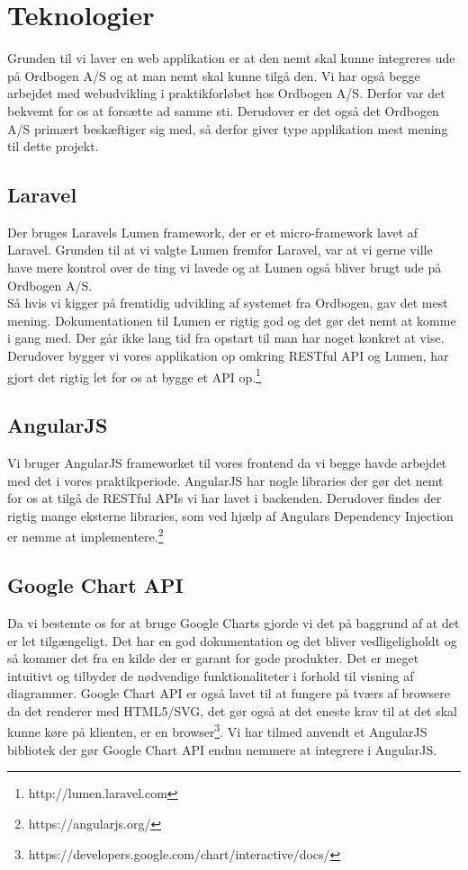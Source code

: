 \hypertarget{Teknologier}{}
\section{Teknologier}
Grunden til vi laver en web applikation er at den nemt skal kunne integreres ude på Ordbogen A/S  og at man nemt skal kunne tilgå den.
Vi har også begge arbejdet med webudvikling i praktikforløbet hos Ordbogen A/S. Derfor var det bekvemt for os at forsætte ad samme sti.
Derudover er det også det Ordbogen A/S primært beskæftiger sig med, så derfor giver type applikation mest mening til dette projekt.
\hypertarget{Laravel}{}
\subsection{Laravel}
\label{Laravel}
Der bruges Laravels Lumen framework, der er et micro-framework lavet af Laravel. Grunden til at vi valgte Lumen
fremfor Laravel, var at vi gerne ville have mere kontrol over de ting vi lavede og at Lumen også bliver brugt ude på Ordbogen A/S.
\\
Så hvis vi kigger på fremtidig udvikling af systemet fra Ordbogen, gav det mest mening.
Dokumentationen til Lumen er rigtig god og det gør det nemt at komme i gang med. Der går ikke lang tid fra opstart
til man har noget konkret at vise. 
Derudover bygger vi vores applikation op omkring RESTful API og Lumen, har gjort det rigtig let for os at bygge 
et API op.\footnote{http://lumen.laravel.com}
\hypertarget{AngularJS}{}
\subsection{AngularJS}
Vi bruger AngularJS frameworket til vores frontend da vi begge havde arbejdet med det
i vores praktikperiode. AngularJS har nogle libraries der gør det nemt for os at tilgå de RESTful APIs
vi har lavet i backenden. 
Derudover findes der rigtig mange eksterne libraries, som ved hjælp af Angulars Dependency Injection er nemme at implementere.\footnote{https://angularjs.org/}
\hypertarget{GoogleChartAPI}{}
\subsection{Google Chart API}
Da vi bestemte os for at bruge Google Charts gjorde vi det på baggrund af at det er let tilgængeligt.
Det har en god dokumentation og det bliver vedligeligholdt og så kommer det fra en kilde der er garant for gode produkter.
Det er meget intuitivt og tilbyder de nødvendige funktionaliteter i forhold til visning af diagrammer.
Google Chart API er også lavet til at fungere på tværs af browsere da det renderer med HTML5/SVG, 
det gør også at det eneste krav til at det skal kunne køre på klienten, er en browser\footnote{https://developers.google.com/chart/interactive/docs/}. 
Vi har tilmed anvendt et AngularJS bibliotek der gør Google Chart API endnu nemmere at integrere i AngularJS.
